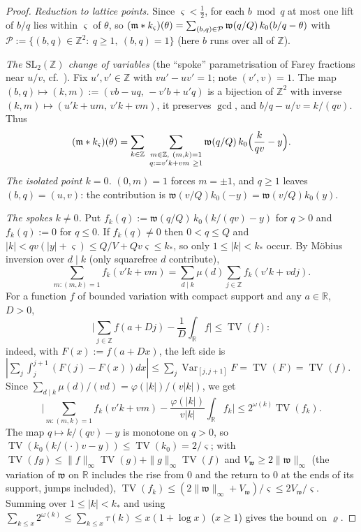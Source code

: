 \begin{proof}
\emph{Reduction to lattice points.} Since $\varsigma<\frac12$, for each $b\bmod q$ at most one lift of $b/q$ lies within
$\varsigma$ of $\theta$, so
$(\mathfrak m*k_{\varsigma})(\theta)=\sum_{(b,q)\in\mathcal P}\mathfrak w(q/Q)\,k_0(b/q-\theta)$ with
$\mathcal P:=\{(b,q)\in\mathbb Z^2:\ q\ge1,\ (b,q)=1\}$ (here $b$ runs over all of $\mathbb Z$).

\emph{The $\mathrm{SL}_2(\mathbb Z)$ change of variables} (the ``spoke'' parametrisation of Farey fractions near $u/v$, cf.\ \cite{BCZ01}). Fix $u',v'\in\mathbb Z$ with $vu'-uv'=1$; note $(v',v)=1$. The map
$(b,q)\mapsto(k,m):=(vb-uq,\,-v'b+u'q)$ is a bijection of $\mathbb Z^2$ with inverse $(k,m)\mapsto(u'k+um,\,v'k+vm)$,
it preserves $\gcd$, and $b/q-u/v=k/(qv)$. Thus
\begin{equation}\label{eqA:spokes}
 (\mathfrak m*\Wkd)(\theta)=\sum_{k\in\mathbb Z}\ \sum_{\substack{m\in\mathbb Z,\ (m,k)=1\\ q:=v'k+vm\ \ge1}}
 \mathfrak w(q/Q)\,k_0\Big(\frac{k}{qv}-y\Big).
\end{equation}
\emph{The isolated point $k=0$.} $(0,m)=1$ forces $m=\pm1$, and $q\ge1$ leaves $(b,q)=(u,v)$: the contribution is
$\mathfrak w(v/Q)k_0(-y)=\mathfrak w(v/Q)k_0(y)$.

\emph{The spokes $k\ne0$.} Put $f_k(q):=\mathfrak w(q/Q)\,k_0(k/(qv)-y)$ for $q>0$ and $f_k(q):=0$ for $q\le0$.
If $f_k(q)\ne0$ then $0<q\le Q$ and $|k|<qv(|y|+\varsigma)\le Q/V+Qv\varsigma\le k_*$, so only $1\le|k|<k_*$ occur. By
M\"obius inversion over $d\mid k$ (only squarefree $d$ contribute),
\[
 \sum_{m:(m,k)=1}f_k(v'k+vm)=\sum_{d\mid k}\mu(d)\sum_{j\in\mathbb Z}f_k(v'k+vdj).
\]
For a function $f$ of bounded variation with compact support and any $a\in\mathbb R$, $D>0$,
\begin{equation}\label{eqA:APTV}
 \Big|\sum_{j\in\mathbb Z}f(a+Dj)-\frac1D\int_{\mathbb R}f\Big|\le\operatorname{TV}(f):
\end{equation}
indeed, with $F(x):=f(a+Dx)$, the left side is $|\sum_j\int_j^{j+1}(F(j)-F(x))dx|\le\sum_j\operatorname{Var}_{[j,j+1]}F=\operatorname{TV}(F)=\operatorname{TV}(f)$.
Since $\sum_{d\mid k}\mu(d)/(vd)=\varphi(|k|)/(v|k|)$, we get
\[
 \Big|\sum_{m:(m,k)=1}f_k(v'k+vm)-\frac{\varphi(|k|)}{v|k|}\int_{\mathbb R}f_k\Big|\le 2^{\omega(k)}\operatorname{TV}(f_k).
\]
The map $q\mapsto k/(qv)-y$ is monotone on $q>0$, so $\operatorname{TV}(k_0(k/(\cdot)v-y))\le\operatorname{TV}(k_0)=2/\varsigma$; with
$\operatorname{TV}(fg)\le\|f\|_\infty\operatorname{TV}(g)+\|g\|_\infty\operatorname{TV}(f)$ and $V_{\mathfrak w}\ge2\|\mathfrak w\|_\infty$ (the variation of $\mathfrak w$ on $\mathbb R$ includes the rise from $0$ and the return to $0$ at the ends of its support, jumps included),
$\operatorname{TV}(f_k)\le(2\|\mathfrak w\|_\infty+V_{\mathfrak w})/\varsigma\le2V_{\mathfrak w}/\varsigma$. Summing over $1\le|k|<k_*$ and using
$\sum_{k\le x}2^{\omega(k)}\le\sum_{k\le x}\tau(k)\le x(1+\log x)$ ($x\ge1$) gives the bound on $\varrho$.


\end{proof}
